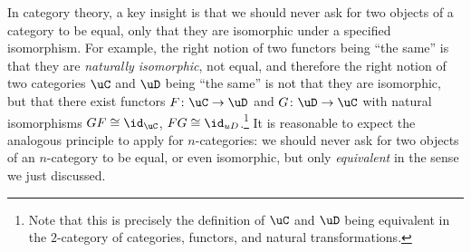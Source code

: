 \documentclass[a4paper,12pt]{article}
\begin{document}
In category theory, a key insight is that we should never ask for two
objects of a category to be equal, only that they are isomorphic under
a specified isomorphism. For example, the right notion of two functors
being ``the same'' is that they are \emph{naturally isomorphic}, not
equal, and therefore the right notion of two categories $\uC$ and
$\uD$ being ``the same'' is not that they are isomorphic, but that
there exist functors $F \colon \uC \to \uD$ and $G \colon \uD \to \uC$
with natural isomorphisms $GF \cong \id_{\uC}$, $FG \cong
\id_{uD}$.\footnote{Note that this is precisely the definition of $\uC$ and
$\uD$ being equivalent in the $2$-category of categories, functors, and
natural transformations.} It is reasonable to expect the analogous
principle to apply for $n$-categories: we should never ask for two
objects of an $n$-category to be equal, or even isomorphic, but only
\emph{equivalent} in the sense we just discussed.
\end{document}
